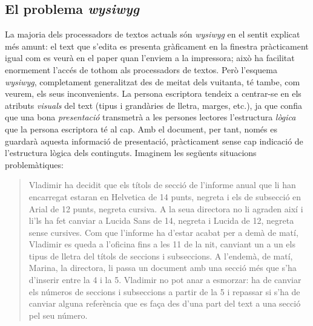 \subsection{El problema \emph{wysiwyg}}
\label{s3:problema_wysiwyg}

La majoria dels processadors de textos actuals són \emph{wysiwyg} en
el sentit explicat més amunt: el text que s'edita es presenta
gràficament en la finestra pràcticament igual com es veurà en el paper
quan l'enviem a la impressora; això ha facilitat enormement l'accés
de tothom als processadors de textos. Però l'esquema \emph{wysiwyg},
completament generalitzat des de meitat dels vuitanta, té tambe, com
veurem, els seus inconvenients.  La persona escriptora tendeix a
centrar-se en els atributs \emph{visuals} del text (tipus i grandàries
de lletra, marges, etc.), ja que confia que una bona
\emph{presentació} transmetrà a les persones lectores l'estructura
\emph{lògica} que la persona escriptora té al cap.  Amb el
document, per tant, només es guardarà aquesta informació de
presentació, pràcticament sense cap indicació de l'estructura lògica
dels continguts. Imaginem les següents situacions problemàtiques:
  \begin{quote}
      Vladimir ha decidit que els títols de secció de l'informe anual
      que li han encarregat estaran en Helvetica de 14 punts, negreta
      i els de subsecció en Arial de 12 punts, negreta cursiva. A la
      seua directora no li agraden així i li'ls ha fet canviar a
      Lucida Sans de 14, negreta i Lucida de 12, negreta sense
      cursives. Com que l'informe ha d'estar acabat per a demà de
      matí, Vladimir es queda a l'oficina fins a les 11 de la nit,
      canviant un a un els tipus de lletra del títols de seccions i
      subseccions. A l'endemà, de matí, Marina, la directora, li passa
      un document amb una secció més que s'ha d'inserir entre la 4 i
      la 5. Vladimir no pot anar a esmorzar: ha de canviar els números
      de seccions i subseccions a partir de la 5 i repassar si s'ha de
      canviar alguna referència que es faça des d'una part del text a
      una secció pel seu número.
  \end{quote}


